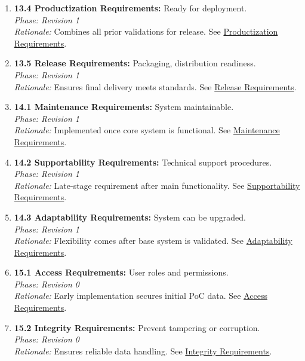 \documentclass[11pt]{article}
\begin{document}
\begin{enumerate}
    \item \textbf{13.4 Productization Requirements:} Ready for deployment.\\
    \textit{Phase: Revision 1} \\
    \textit{Rationale:} Combines all prior validations for release. See \hyperref[subsec:productization]{Productization Requirements}.

    \item \textbf{13.5 Release Requirements:} Packaging, distribution readiness.\\
    \textit{Phase: Revision 1} \\
    \textit{Rationale:} Ensures final delivery meets standards. See \hyperref[subsec:release]{Release Requirements}.

    \item \textbf{14.1 Maintenance Requirements:} System maintainable.\\
    \textit{Phase: Revision 1} \\
    \textit{Rationale:} Implemented once core system is functional. See \hyperref[subsec:maintenance]{Maintenance Requirements}.

    \item \textbf{14.2 Supportability Requirements:} Technical support procedures.\\
    \textit{Phase: Revision 1} \\
    \textit{Rationale:} Late-stage requirement after main functionality. See \hyperref[subsec:supportability]{Supportability Requirements}.

    \item \textbf{14.3 Adaptability Requirements:} System can be upgraded.\\
    \textit{Phase: Revision 1} \\
    \textit{Rationale:} Flexibility comes after base system is validated. See \hyperref[subsec:adaptability]{Adaptability Requirements}.

    \item \textbf{15.1 Access Requirements:} User roles and permissions.\\
    \textit{Phase: Revision 0} \\
    \textit{Rationale:} Early implementation secures initial PoC data. See \hyperref[subsec:access]{Access Requirements}.

    \item \textbf{15.2 Integrity Requirements:} Prevent tampering or corruption.\\
    \textit{Phase: Revision 0} \\
    \textit{Rationale:} Ensures reliable data handling. See \hyperref[subsec:integrity]{Integrity Requirements}.


\end{enumerate}
\end{document}
